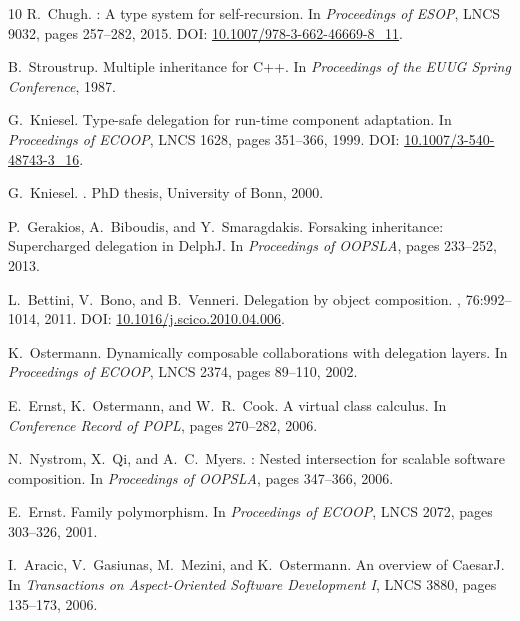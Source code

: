 \documentclass[acmsmall,nonacm]{acmart}
\theoremstyle{acmplain}
\begin{document}
\begin{thebibliography}{10}
R.~Chugh.
: A type system for self-recursion.
\newblock In {\em Proceedings of ESOP}, LNCS 9032, pages 257--282, 2015.
\newblock DOI: \href{https://doi.org/10.1007/978-3-662-46669-8_11}{10.1007/978-3-662-46669-8\_11}.

B.~Stroustrup.
\newblock Multiple inheritance for {C++}.
\newblock In {\em Proceedings of the EUUG Spring Conference}, 1987.

G.~Kniesel.
\newblock Type-safe delegation for run-time component adaptation.
\newblock In {\em Proceedings of ECOOP}, LNCS 1628, pages 351--366, 1999.
\newblock DOI: \href{https://doi.org/10.1007/3-540-48743-3_16}{10.1007/3-540-48743-3\_16}.

G.~Kniesel.
.
\newblock PhD thesis, University of Bonn, 2000.

P.~Gerakios, A.~Biboudis, and Y.~Smaragdakis.
\newblock Forsaking inheritance: Supercharged delegation in {DelphJ}.
\newblock In {\em Proceedings of OOPSLA}, pages 233--252, 2013.

L.~Bettini, V.~Bono, and B.~Venneri.
\newblock Delegation by object composition.
, 76:992--1014, 2011.
\newblock DOI: \href{https://doi.org/10.1016/j.scico.2010.04.006}{10.1016/j.scico.2010.04.006}.

K.~Ostermann.
\newblock Dynamically composable collaborations with delegation layers.
\newblock In {\em Proceedings of ECOOP}, LNCS 2374, pages 89--110, 2002.

E.~Ernst, K.~Ostermann, and W.~R.~Cook.
\newblock A virtual class calculus.
\newblock In {\em Conference Record of POPL}, pages 270--282, 2006.

N.~Nystrom, X.~Qi, and A.~C.~Myers.
: Nested intersection for scalable software composition.
\newblock In {\em Proceedings of OOPSLA}, pages 347--366, 2006.

E.~Ernst.
\newblock Family polymorphism.
\newblock In {\em Proceedings of ECOOP}, LNCS 2072, pages 303--326, 2001.

I.~Aracic, V.~Gasiunas, M.~Mezini, and K.~Ostermann.
\newblock An overview of {CaesarJ}.
\newblock In {\em Transactions on Aspect-Oriented Software Development I}, LNCS 3880, pages 135--173, 2006.


\end{thebibliography}
\end{document}
